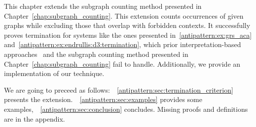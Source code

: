This chapter extends the subgraph counting method presented in Chapter~\ref{chap:subgraph_counting}. This extension counts occurrences of given graphs while excluding those that overlap with forbidden contexts.
It successfully proves termination for systems like the ones presented 
in~\autoref{antipattern:ex:grs_aca} and~\autoref{antipattern:ex:endrullis:d3:termination}, which prior interpretation-based approaches~\cite{zantema2014termination,bruggink2014termination,bruggink2015proving,endrullis2024generalized_arxiv_v2,overbeek2024termination_lmcs} and the subgraph counting method presented in Chapter~\ref{chap:subgraph_counting} fail to handle. 
Additionally, we provide an implementation of our technique.

We are going to preceed as follows:~\textsection~\ref{antipattern:sec:termination_criterion} presents the extension.~\textsection~\ref{antipattern:sec:examples} provides some examples,~\textsection~\ref{antipattern:sec:conclusion} concludes. Missing proofs and definitions are in the appendix. 
